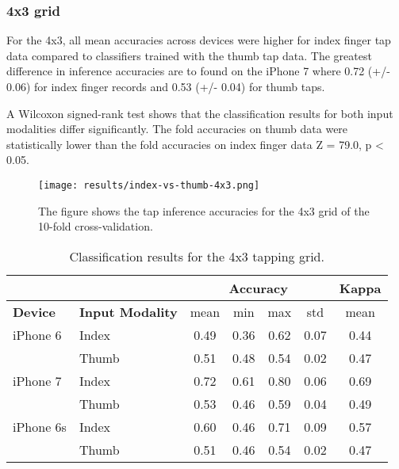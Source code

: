\begin{appendix}
\subsubsection*{4x3 grid}
For the 4x3, all mean accuracies across devices were higher for index finger tap data compared to classifiers trained with the thumb tap data. The greatest difference in inference accuracies are to found on the iPhone 7 where 0.72 (+/- 0.06) for index finger records and 0.53 (+/- 0.04) for thumb taps.

A Wilcoxon signed-rank test shows that the classification results for both input modalities differ significantly. The fold accuracies on thumb data were statistically lower than the fold accuracies on index finger data Z = 79.0, p < 0.05.


\begin{figure}[h!]
  \centering
  \texttt{[image: results/index-vs-thumb-4x3.png]}
  \caption{The figure shows the tap inference accuracies for the 4x3 grid of the 10-fold cross-validation.} \label{fig:participation}
\end{figure}

\begin{table}[h!]
  \centering
\begin{tabular}{|l|l|c|c|c|c|c|}
  \cline{3-7}
  \multicolumn{2}{c}{} & \multicolumn{4}{|c|}{\textbf{Accuracy}} & \textbf{Kappa} \\
  \hline
  \textbf{Device} & \textbf{Input Modality} & mean &   min &   max  & std &  mean \\
  \hline
	iPhone 6 & Index &      0.49 &     0.36 &     0.62 &     0.07 &        0.44 \\
	& Thumb &      0.51 &     0.48 &     0.54 &     0.02 &        0.47 \\
	\hline
iPhone 7 & Index &      0.72 &     0.61 &     0.80 &     0.06 &        0.69 \\
	& Thumb &      0.53 &     0.46 &     0.59 &     0.04 &        0.49 \\
	\hline
iPhone 6s & Index &      0.60 &     0.46 &     0.71 &     0.09 &        0.57 \\
	& Thumb &      0.51 &     0.46 &     0.54 &     0.02 &        0.47 \\
  \hline
\end{tabular}
  \caption{Classification results for the 4x3 tapping grid.}
\end{table}



\end{appendix}

\endinput
